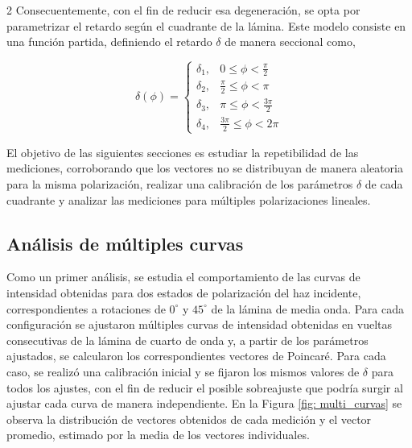 \documentclass[11pt,a4paper]{article}
\begin{document}
\begin{multicols}{2}
Consecuentemente, con el fin de reducir esa degeneración, se opta por parametrizar el retardo según el cuadrante de la lámina. Este modelo consiste en una función partida, definiendo el retardo $\delta$ de manera seccional como,

\[
\delta(\phi)=
\begin{cases}
\delta_1, & 0 \leq \phi < \frac{\pi}{2} \\
\delta_2, & \frac{\pi}{2} \leq \phi < \pi \\
\delta_3, & \pi \leq \phi < \frac{3\pi}{2} \\
\delta_4, & \frac{3\pi}{2} \leq \phi < 2\pi
\end{cases}
\]

El objetivo de las siguientes secciones es estudiar la repetibilidad de las mediciones, corroborando que los vectores no se distribuyan de manera aleatoria para la misma polarización, realizar una calibración de los parámetros $\delta$ de cada cuadrante y analizar las mediciones para múltiples polarizaciones lineales.

\subsection{Análisis de múltiples curvas}

Como un primer análisis, se estudia el comportamiento de las curvas de intensidad obtenidas para dos estados de polarización del haz incidente, correspondientes a rotaciones de $0^\circ$ y $45^\circ$ de la lámina de media onda. Para cada configuración se ajustaron múltiples curvas de intensidad obtenidas en vueltas consecutivas de la lámina de cuarto de onda y, a partir de los parámetros ajustados, se calcularon los correspondientes vectores de Poincaré. Para cada caso, se realizó una calibración inicial y se fijaron los mismos valores de $\delta$ para todos los ajustes, con el fin de reducir el posible sobreajuste que podría surgir al ajustar cada curva de manera independiente. En la Figura \ref{fig: multi_curvas} se observa la distribución de vectores obtenidos de cada medición y el vector promedio, estimado por la media de los vectores individuales.


\end{multicols}
\end{document}
